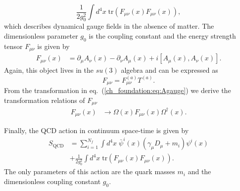 \begin{equation}
\label{ch_foundation:eq:SYM}
\frac{1}{2g_0^2}\int d^4x\;\textrm{tr}(F_{\mu\nu}(x)F_{\mu\nu}(x)),
\end{equation}
which describes dynamical gauge fields in the absence of matter. The dimensionless parameter $g_0$ is the coupling constant and the energy strength tensor $F_{\mu\nu}$ is given by
\begin{align}
F_{\mu\nu}(x)&=\partial_{\mu}A_{\nu}(x)-\partial_{\nu}A_{\mu}(x)+i\left[A_{\mu}(x),A_{\nu}(x)\right].
\end{align}
Again, this object lives in the $su(3)$ algebra and can be expressed as
\begin{equation}
F_{\mu\nu}=F_{\mu\nu}^{(a)}T^{(a)}.
\end{equation}
From the transformation in eq.~(\ref{ch_foundation:eq:Agauge}) we derive the transformation relations of $F_{\mu\nu}$
\begin{align}
F_{\mu\nu}(x)&\to\Omega(x)F_{\mu\nu}(x)\Omega^{\dagger}(x).
\end{align}

Finally, the QCD action in continuum space-time is given by 
\begin{align}
\label{ch_foundation:eq:QCD}
S_{\textrm{QCD}}&=\sum_{i=1}^{N_f}\int d^4x\;\bar{\psi}^i(x)\left(\gamma_{\mu}D_{\mu}+m_i\right)\psi^i(x) \\
&+\frac{1}{2g_0^2}\int d^4x\;{\textrm{tr}}\left(F_{\mu\nu}(x)F_{\mu\nu}(x)\right).
\end{align}
The only parameters of this action are the quark masses $m_i$ and the dimensionless coupling constant $g_0$.

